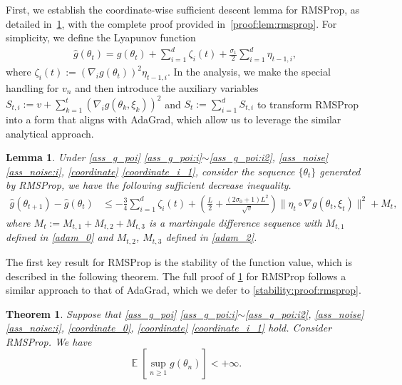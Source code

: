 \documentclass[standalone]{article}
\newtheorem{thm}{Theorem}[section]
\newtheorem{lem}{Lemma}[section]
\DeclareMathOperator{\Expect}{\mathbb{E}}
\begin{document}
First, we establish the coordinate-wise sufficient descent lemma for RMSProp, as detailed in~\cref{sufficient:lem'},  with the complete proof provided in~\cref{proof:lem:rmsprop}. For simplicity, we define the Lyapunov function
\begin{align}\hat{g}(\theta_t) = g(\theta_{t})+\sum_{i=1}^{d}\zeta_{i}(t)+\frac{\sigma_{1}}{2}\sum_{i=1}^{d}\eta_{t-1,i},
\end{align}
where $\zeta_{i}(t) := (\nabla_{i}g(\theta_{t}))^{2}\eta_{t-1,i}$. In the analysis, we make the special handling for \(v_n\) and then introduce the auxiliary variables $S_{t,i}:=v+\sum_{k=1}^{t}(\nabla_{i}g(\theta_{k},\xi_{k}))^{2}$ and $S_{t} := \sum_{i=1}^{d}S_{t,i}$ to transform RMSProp into a form that aligns with AdaGrad, which allow us to leverage the similar analytical approach.  %
\begin{lem}\label{sufficient:lem'}
Under \cref{ass_g_poi} \ref{ass_g_poi:i}$\sim$\ref{ass_g_poi:i2}, \cref{ass_noise} \ref{ass_noise:i}, \cref{coordinate} \ref{coordinate_i_1}, consider the sequence $\{\theta_{t}\}$ generated by RMSProp, we have the following sufficient decrease inequality. 
\begin{align}\label{jh_30}
\hat{g}(\theta_{t+1})-\hat{g}(\theta_t) & \le-\frac{3}{4}\sum_{i=1}^{d}\zeta_{i}(t)+\left(\frac{ L}{2}+\frac{(2\sigma_{0}+1) L^{2}}{\sqrt{v}}\right)\|\eta_{t}\circ \nabla g(\theta_{t},\xi_{t})\|^{2}+M_{t},
\end{align} 
where $M_{t}:=M_{t,1}+M_{t,2}+M_{t,3}$ is a martingale difference sequence with \( M_{t,1} \) defined in \cref{adam_0} and \( M_{t,2} \), \( M_{t,3} \) defined in  \cref{adam_2}.
\end{lem}
The first key result for RMSProp is the stability of the function value, which is described in the following theorem. The full proof of \cref{bound''} for RMSProp follows a similar approach to that of AdaGrad, which we defer to \cref{stability:proof:rmsprop}.
\begin{thm}\label{bound''}
Suppose that \cref{ass_g_poi} \ref{ass_g_poi:i}$\sim$\ref{ass_g_poi:i2}, \cref{ass_noise} \ref{ass_noise:i}, \cref{coordinate_0}, \cref{coordinate} \cref{coordinate_i_1} hold. Consider RMSProp. We have
\[\Expect\left[\sup_{n\ge 1}g(\theta_{n})\right] < +\infty.\]
\end{thm}
\end{document}
